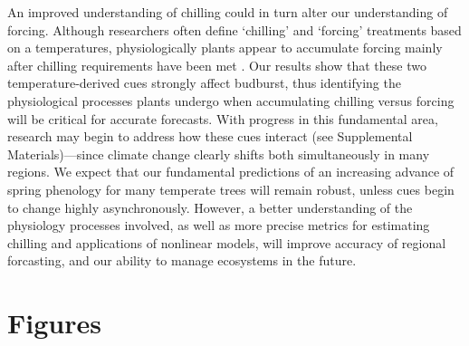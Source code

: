 \documentclass{article}
\begin{document}

\par An improved understanding of chilling could in turn alter our understanding of forcing. Although researchers often define `chilling' and `forcing' treatments based on a temperatures, physiologically plants appear to accumulate forcing mainly after chilling requirements have been met \citep{chuine2016}. Our results show that these two temperature-derived cues strongly affect budburst, thus identifying the physiological processes plants undergo when accumulating chilling versus forcing will be critical for accurate forecasts. With progress in this fundamental area, research may begin to address how these cues interact (see Supplemental Materials)---since climate change clearly shifts both simultaneously in many regions. We expect that our fundamental predictions of an increasing advance of spring phenology for many temperate trees will remain robust, unless cues begin to change highly asynchronously. However, a better understanding of the physiology processes involved, as well as more precise metrics for estimating chilling and applications of nonlinear models, will improve accuracy of regional forcasting, and our ability to manage ecosystems in the future.

\section* {Figures}

\newpage
\end{document}
